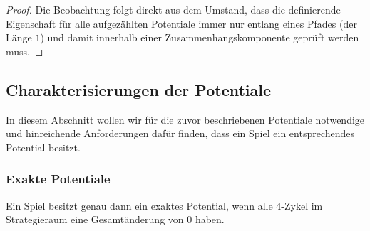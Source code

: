 \begin{proof}
	Die Beobachtung folgt direkt aus dem Umstand, dass die definierende Eigenschaft für alle aufgezählten Potentiale immer nur entlang eines Pfades (der Länge $1$) und damit innerhalb einer Zusammenhangskomponente geprüft werden muss.
\end{proof}


\subsection{Charakterisierungen der Potentiale}\label{sec:Potentiale:Charakterisierungen}

In diesem Abschnitt wollen wir für die zuvor beschriebenen Potentiale notwendige und hinreichende Anforderungen dafür finden, dass ein Spiel ein entsprechendes Potential besitzt.

\subsubsection{Exakte Potentiale}

\begin{satz}\label{satz:CharExPot}
	Ein Spiel besitzt genau dann ein exaktes Potential, wenn alle 4-Zykel im Strategieraum eine Gesamtänderung von $0$ haben.
\end{satz}

